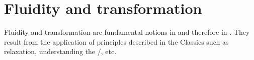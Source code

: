 \chapter{Fluidity and transformation}\label{ch:transformation}

Fluidity and transformation are fundamental notions in \Taijiquan{} and therefore in  \Taijijian{}.
They result from the application of principles described in the Classics such as relaxation, understanding the \Yin/\Yang{}, etc.
